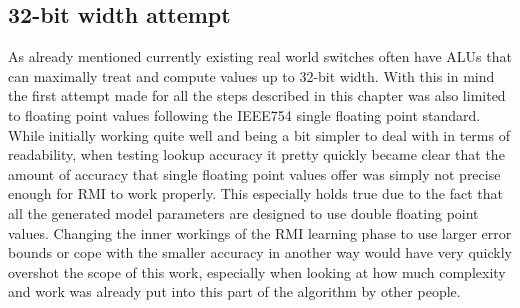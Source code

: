 \subsection{32-bit width attempt}
As already mentioned currently existing real world switches often have ALUs that can maximally treat and compute values up to 32-bit width. With this in mind the first attempt made for all the steps described in this chapter was also limited to floating point values following the IEEE754 single floating point standard. While initially working quite well and being a bit simpler to deal with in terms of readability, when testing lookup accuracy it pretty quickly became clear that the amount of accuracy that single floating point values offer was simply not precise enough for RMI to work properly. This especially holds true due to the fact that all the generated model parameters are designed to use double floating point values. Changing the inner workings of the RMI learning phase to use larger error bounds or cope with the smaller accuracy in another way would have very quickly overshot the scope of this work, especially when looking at how much complexity and work was already put into this part of the algorithm by other people.
